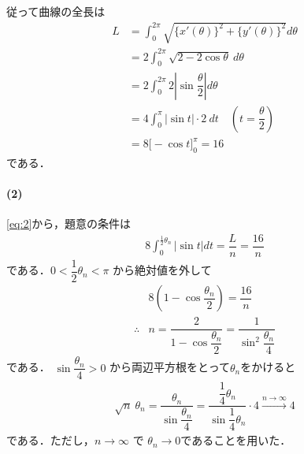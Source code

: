 \documentclass[../../main.tex]{subfiles}
\begin{document}
従って曲線の全長は
\begin{align}
  L &= \int_0^{2\pi} \sqrt{\{x'(\theta)\}^2 + \{y'(\theta)\}^2} d\theta \\
  &= 2 \int_0^{2\pi} \sqrt{2 - 2\cos\theta} \ d\theta \\
  &= 2 \int_0^{2\pi} 2 \left| \sin\dfrac{\theta}{2} \right| d\theta \\
  &= 4 \int_0^\pi |\sin t| \cdot 2\ dt \quad \left(t = \dfrac{\theta}{2}\right) \label{eq:2}\\
  &= 8 \big[ -\cos t \big]_0^\pi = 16
\end{align}
である．

\paragraph{(2)}

\cref{eq:2}から，題意の条件は
\begin{align}
  8 \int_0^{\frac{1}{2}\theta_n} |\sin t| dt = \dfrac{L}{n} = \dfrac{16}{n}
\end{align}
である．$0 < \dfrac{1}{2}\theta_n < \pi$ から絶対値を外して
\begin{align}
  & 8 \left( 1 - \cos\dfrac{\theta_n}{2} \right) = \dfrac{16}{n} \\
  \therefore
  & n = \dfrac{2}{1 - \cos\dfrac{\theta_n}{2}} = \dfrac{1}{\sin^2\dfrac{\theta_n}{4}}
\end{align}
である． $\sin\dfrac{\theta_n}{4} > 0$ から両辺平方根をとって$\theta_n$をかけると
\begin{align}
  \sqrt{n}\ \theta_n
  = \dfrac{\theta_n}{\sin\dfrac{\theta_n}{4}}
  = \dfrac{\dfrac{1}{4}\theta_n}{\sin\dfrac{1}{4}\theta_n} \cdot 4
  \xrightarrow{n\to\infty} 4
\end{align}
である．ただし，$n \to \infty$ で $\theta_n \to 0$であることを用いた．
\end{document}
